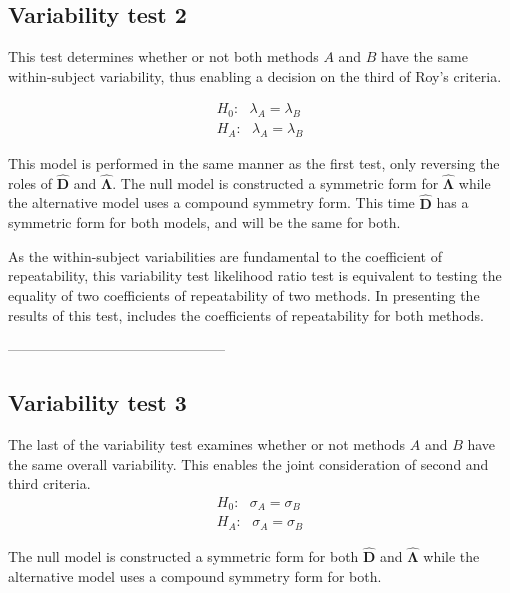 \documentclass[12pt, a4paper]{report}
\theoremstyle{plain}
\theoremstyle{definition}
\theoremstyle{remark}
\begin{document}
\subsection{Variability test 2}

This test determines whether or not both methods $A$ and $B$ have the same within-subject variability, thus enabling a decision on the third of Roy's criteria.

\begin{eqnarray*}
	H_{0}: \mbox{ }\lambda_{A}  = \lambda_{B} \\
	H_{A}: \mbox{ }\lambda_{A}  = \lambda_{B}
\end{eqnarray*}

This model is performed in the same manner as the first test, only reversing the roles of $\boldsymbol{\hat{D}}$ and $\boldsymbol{\hat{\Lambda}}$. The null model is constructed a symmetric form for $\boldsymbol{\hat{\Lambda}}$ while the alternative model uses a compound symmetry form. This time $\boldsymbol{\hat{D}}$ has a symmetric form for both models, and will be the same for both.

As the within-subject variabilities are fundamental to the coefficient of repeatability, this variability test likelihood ratio test is equivalent to testing the equality of two coefficients of repeatability of two methods. In presenting the results of this test, \citet{roy} includes the coefficients of repeatability for both methods.

-----------------------------------------------%
\subsection{Variability test 3}
The last of the variability test examines whether or not methods $A$ and $B$ have the same overall variability. This enables the joint consideration of second and third criteria.
\begin{eqnarray*}
	H_{0}: \mbox{ }\sigma_{A}  = \sigma_{B} \\
	H_{A}: \mbox{ }\sigma_{A}  = \sigma_{B}
\end{eqnarray*}

The null model is constructed a symmetric form for both $\boldsymbol{\hat{D}}$ and $\boldsymbol{\hat{\Lambda}}$ while the alternative model uses a compound symmetry form for both.
\end{document}
